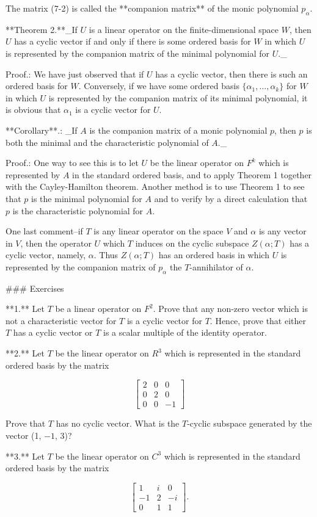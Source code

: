 The matrix (7-2) is called the **companion matrix** of the monic polynomial \(p_{\alpha}\).

**Theorem 2.**_If \(U\) is a linear operator on the finite-dimensional space \(W\), then \(U\) has a cyclic vector if and only if there is some ordered basis for \(W\) in which \(U\) is represented by the companion matrix of the minimal polynomial for \(U\)._

Proof.: We have just observed that if \(U\) has a cyclic vector, then there is such an ordered basis for \(W\). Conversely, if we have some ordered basis \(\{\alpha_{1},\ldots,\alpha_{k}\}\) for \(W\) in which \(U\) is represented by the companion matrix of its minimal polynomial, it is obvious that \(\alpha_{1}\) is a cyclic vector for \(U\).

**Corollary**.: _If \(A\) is the companion matrix of a monic polynomial \(p\), then \(p\) is both the minimal and the characteristic polynomial of \(A\)._

Proof.: One way to see this is to let \(U\) be the linear operator on \(F^{k}\) which is represented by \(A\) in the standard ordered basis, and to apply Theorem 1 together with the Cayley-Hamilton theorem. Another method is to use Theorem 1 to see that \(p\) is the minimal polynomial for \(A\) and to verify by a direct calculation that \(p\) is the characteristic polynomial for \(A\).

One last comment--if \(T\) is any linear operator on the space \(V\) and \(\alpha\) is any vector in \(V\), then the operator \(U\) which \(T\) induces on the cyclic subspace \(Z(\alpha;T)\) has a cyclic vector, namely, \(\alpha\). Thus \(Z(\alpha;T)\) has an ordered basis in which \(U\) is represented by the companion matrix of \(p_{\alpha}\) the \(T\)-annihilator of \(\alpha\).

### Exercises

**1.** Let \(T\) be a linear operator on \(F^{2}\). Prove that any non-zero vector which is not a characteristic vector for \(T\) is a cyclic vector for \(T\). Hence, prove that either \(T\) has a cyclic vector or \(T\) is a scalar multiple of the identity operator.

**2.** Let \(T\) be the linear operator on \(R^{3}\) which is represented in the standard ordered basis by the matrix

\[\begin{bmatrix}2&0&0\\ 0&2&0\\ 0&0&-1\end{bmatrix}\]

Prove that \(T\) has no cyclic vector. What is the \(T\)-cyclic subspace generated by the vector (1, \(-1\), 3)?

**3.** Let \(T\) be the linear operator on \(C^{3}\) which is represented in the standard ordered basis by the matrix

\[\begin{bmatrix}1&i&0\\ -1&2&-i\\ 0&1&1\end{bmatrix}.\] 